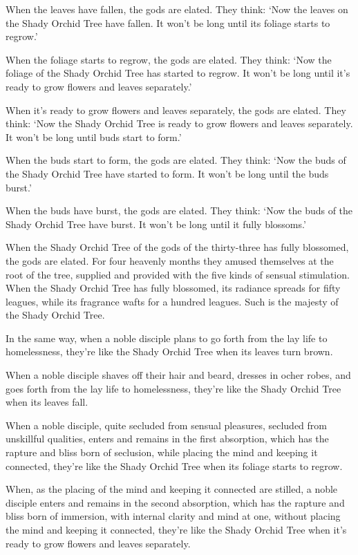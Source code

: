 \documentclass[12pt,openany]{book}%
\begin{document}
When the leaves have fallen, the gods are elated. They think: ‘Now the leaves on the Shady Orchid Tree have fallen. It won’t be long until its foliage starts to regrow.’ 

When the foliage starts to regrow, the gods are elated. They think: ‘Now the foliage of the Shady Orchid Tree has started to regrow. It won’t be long until it’s ready to grow flowers and leaves separately.’ 

When it’s ready to grow flowers and leaves separately, the gods are elated. They think: ‘Now the Shady Orchid Tree is ready to grow flowers and leaves separately. It won’t be long until buds start to form.’ 

When the buds start to form, the gods are elated. They think: ‘Now the buds of the Shady Orchid Tree have started to form. It won’t be long until the buds burst.’ 

When the buds have burst, the gods are elated. They think: ‘Now the buds of the Shady Orchid Tree have burst. It won’t be long until it fully blossoms.’ 

When the Shady Orchid Tree of the gods of the thirty-three has fully blossomed, the gods are elated. For four heavenly months they amused themselves at the root of the tree, supplied and provided with the five kinds of sensual stimulation. When the Shady Orchid Tree has fully blossomed, its radiance spreads for fifty leagues, while its fragrance wafts for a hundred leagues. Such is the majesty of the Shady Orchid Tree. 

In the same way, when a noble disciple plans to go forth from the lay life to homelessness, they’re like the Shady Orchid Tree when its leaves turn brown. 

When a noble disciple shaves off their hair and beard, dresses in ocher robes, and goes forth from the lay life to homelessness, they’re like the Shady Orchid Tree when its leaves fall. 

When a noble disciple, quite secluded from sensual pleasures, secluded from unskillful qualities, enters and remains in the first absorption, which has the rapture and bliss born of seclusion, while placing the mind and keeping it connected, they’re like the Shady Orchid Tree when its foliage starts to regrow. 

When, as the placing of the mind and keeping it connected are stilled, a noble disciple enters and remains in the second absorption, which has the rapture and bliss born of immersion, with internal clarity and mind at one, without placing the mind and keeping it connected, they’re like the Shady Orchid Tree when it’s ready to grow flowers and leaves separately. 
\end{document}
